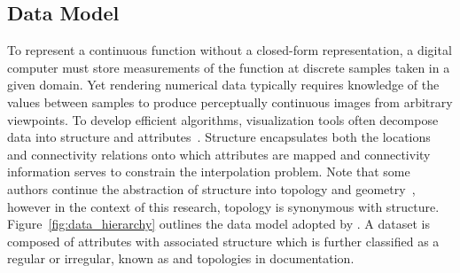 \subsection{Data Model}
To represent a continuous function without a closed-form
representation, a digital computer must store measurements of the
function at discrete samples taken in a given domain. Yet
rendering numerical data typically requires knowledge of the values
between samples to produce perceptually continuous images from
arbitrary viewpoints. To develop efficient algorithms, visualization
tools often decompose data into structure and
attributes~\cite{vtk}. Structure encapsulates both the locations and
connectivity relations onto which attributes are mapped and
connectivity information serves to constrain the interpolation
problem. Note that some authors continue the abstraction of structure
into topology and geometry~\cite{weiler}, however in the context of
this research, topology is synonymous with
structure. Figure~\ref{fig:data_hierarchy} outlines the data model
adopted by \sciwms{}. A dataset is composed of attributes with
associated structure which is further classified as a regular or
irregular, known as {\bf \cgrid{} } and {\bf \ugrid{}} topologies in
\sciwms{} documentation.
